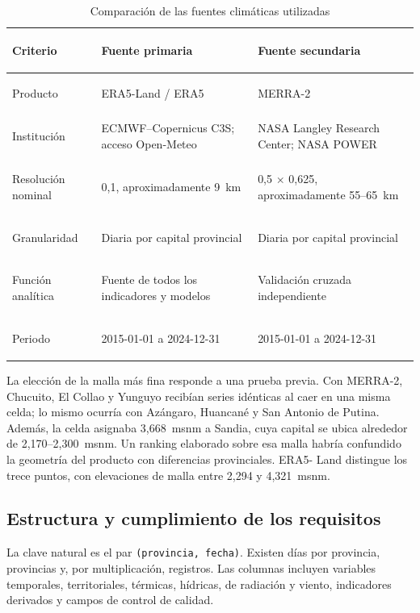 \documentclass[11pt,a4paper]{article}
\begin{document}
\begin{table}[H]
\centering
\caption{Comparación de las fuentes climáticas utilizadas}
\label{tab:fuentes}
\small
\begin{tabularx}{\textwidth}{>{\bfseries\raggedright\arraybackslash}p{3.2cm}XX}
\toprule
Criterio & Fuente primaria & Fuente secundaria \\
\midrule
Producto & ERA5-Land / ERA5 & MERRA-2 \\
Institución & ECMWF--Copernicus C3S; acceso Open-Meteo & NASA Langley Research Center; NASA POWER \\
Resolución nominal & 0,1\textdegree{}, aproximadamente 9~km & 0,5\textdegree{} $\times$ 0,625\textdegree{}, aproximadamente 55--65~km \\
Granularidad & Diaria por capital provincial & Diaria por capital provincial \\
Función analítica & Fuente de todos los indicadores y modelos & Validación cruzada independiente \\
Periodo & 2015-01-01 a 2024-12-31 & 2015-01-01 a 2024-12-31 \\
\bottomrule
\end{tabularx}
\end{table}

La elección de la malla más fina responde a una prueba previa. Con MERRA-2, Chucuito, El
Collao y Yunguyo recibían series idénticas al caer en una misma celda; lo mismo ocurría con
Azángaro, Huancané y San Antonio de Putina. Además, la celda asignaba 3,668~msnm a
Sandia, cuya capital se ubica alrededor de 2,170--2,300~msnm. Un ranking elaborado sobre
esa malla habría confundido la geometría del producto con diferencias provinciales. ERA5-
Land distingue los trece puntos, con elevaciones de malla entre 2,294 y 4,321~msnm.

\subsection{Estructura y cumplimiento de los requisitos}

La clave natural es el par \texttt{(provincia, fecha)}. Existen \NDias{} días por provincia,
\NProvincias{} provincias y, por multiplicación, \NRegistros{} registros. Las \NVariables{}
columnas incluyen variables temporales, territoriales, térmicas, hídricas, de radiación y
viento, indicadores derivados y campos de control de calidad.
\end{document}
